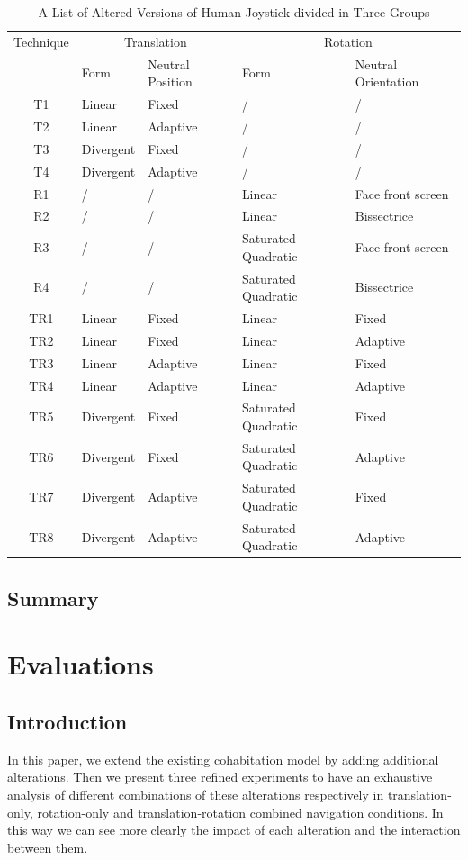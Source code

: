 \begin{table}[!t]
\renewcommand{\arraystretch}{1.3}
\caption{A List of Altered Versions of Human Joystick divided in Three Groups}
\label{tab:3_combinations}
\centering
\begin{tabular}{c l p{2.5cm} l p{2.5cm}}
  \hline
  Technique & \multicolumn{2}{c}{Translation} & \multicolumn{2}{c}{Rotation} \\
   & Form & Neutral Position & Form & Neutral Orientation \\ \hline
  T1 & Linear & Fixed & / & / \\
  T2 & Linear & Adaptive & / & / \\
  T3 & Divergent & Fixed & / & / \\
  T4 & Divergent & Adaptive & / & / \\ \hline
  R1 & / & / & Linear & Face front screen \\
  R2 & / & / & Linear & Bissectrice \\
  R3 & / & / & Saturated Quadratic & Face front screen \\
  R4 & / & / & Saturated Quadratic & Bissectrice \\ \hline
  TR1 & Linear & Fixed & Linear & Fixed \\ TR2 & Linear & Fixed & Linear & Adaptive \\
  TR3 & Linear & Adaptive & Linear & Fixed \\ TR4 & Linear & Adaptive & Linear & Adaptive \\
  TR5 & Divergent & Fixed & Saturated Quadratic & Fixed \\ TR6 & Divergent & Fixed & Saturated Quadratic & Adaptive \\
  TR7 & Divergent & Adaptive & Saturated Quadratic & Fixed \\ TR8 & Divergent & Adaptive & Saturated Quadratic & Adaptive \\
  \hline
\end{tabular}
\end{table}

\subsection{Summary}

\section{Evaluations}
\subsection{Introduction}
In this paper, we extend the existing cohabitation model by adding additional alterations. Then we present three refined experiments to have an exhaustive analysis of different combinations of these alterations respectively in translation-only, rotation-only and translation-rotation combined navigation conditions. In this way we can see more clearly the impact of each alteration and the interaction between them.

